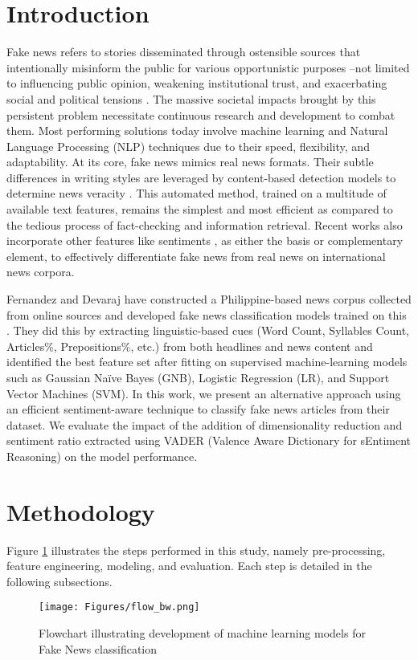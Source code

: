 \documentclass[10pt,a4paper,twoside]{article}
\begin{document}
\section{Introduction}\label{sec:intro}
Fake news refers to stories disseminated through ostensible sources that intentionally misinform the public for various opportunistic purposes --not limited to influencing public opinion, weakening institutional trust, and exacerbating social and political tensions \cite{baptista}. The massive societal impacts brought by this persistent problem necessitate continuous research and development to combat them. Most performing solutions today involve machine learning and Natural Language Processing (NLP) techniques due to their speed, flexibility, and adaptability. At its core, fake news mimics real news formats. Their subtle differences in writing styles are leveraged by content-based detection models to determine news veracity \cite{janze_risius_2017, khanam}. This automated method, trained on a multitude of available text features, remains the simplest and most efficient as compared to the tedious process of fact-checking and information retrieval. Recent works also incorporate other features like sentiments \cite{ajao, Alonso}, as either the basis or complementary element, to effectively differentiate fake news from real news on international news corpora.

Fernandez and Devaraj have constructed a Philippine-based news corpus collected from online sources and developed fake news classification models trained on this  \cite{Fernandez}.   They did this by extracting linguistic-based cues (Word Count, Syllables Count, Articles\%, Prepositions\%, etc.) from both headlines and news content and identified the best feature set after fitting on supervised machine-learning models such as Gaussian Naïve Bayes (GNB), Logistic Regression (LR), and Support Vector Machines (SVM). In this work, we present an alternative approach using an efficient sentiment-aware technique to classify fake news articles from their dataset. We evaluate the impact of the addition of dimensionality reduction and sentiment ratio extracted using VADER (Valence Aware Dictionary for sEntiment Reasoning) on the model performance.

\section{Methodology}\label{sec:figures}
Figure \ref{fig:flow} illustrates the steps performed in this study, namely pre-processing, feature engineering, modeling, and evaluation. Each step is detailed in the following subsections.
\begin{figure}[h!]
    \centering
    \texttt{[image: Figures/flow\_bw.png]}
    \caption{Flowchart illustrating development of machine learning models for Fake News classification}
    \captionsetup{belowskip=0pt}
    \label{fig:flow}
\end{figure}\vspace{-0.5em}
\end{document}
